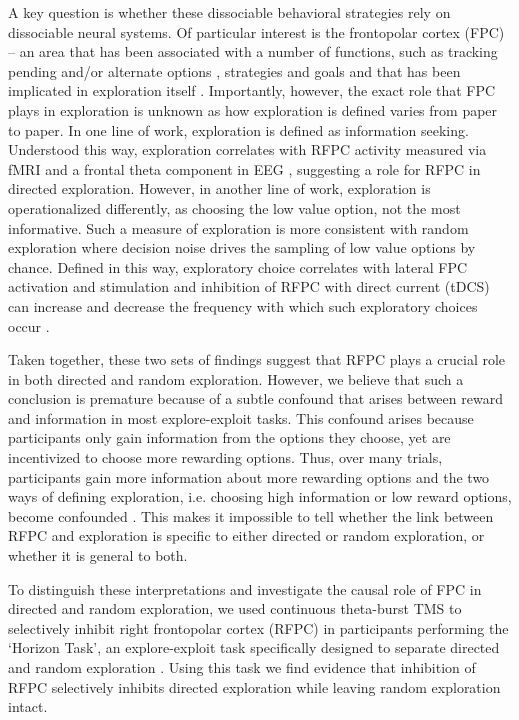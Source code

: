 \documentclass[12pt]{article}
\begin{document}
A key question is whether these dissociable behavioral strategies rely on dissociable neural systems. Of particular interest is the frontopolar cortex (FPC) -- an area that has been associated with a number of functions, such as tracking pending and/or alternate options \cite{koechlin2007anterior,Boorman2009-ns}, strategies \cite{Domenech2015-nz} and goals \cite{Pollmann2016-lc} and that has been implicated in exploration itself \cite{Badre2012-nt,Cavanagh2011-tb,Daw2006-vw}. Importantly, however, the exact role that FPC plays in exploration is unknown as how exploration is defined varies from paper to paper. In one line of work, exploration is defined as information seeking. Understood this way, exploration correlates with RFPC activity measured via fMRI \cite{Badre2012-nt} and a frontal theta component in EEG \cite{Cavanagh2011-tb}, suggesting a role for RFPC in directed exploration.  However, in another line of work, exploration is operationalized differently, as choosing the low value option, not the most informative.  Such a measure of exploration is more consistent with random exploration where decision noise drives the sampling of low value options by chance. Defined in this way, exploratory choice correlates with lateral FPC activation \cite{Daw2006-vw} and stimulation and inhibition of RFPC with direct current (tDCS) can increase and decrease the frequency with which such exploratory choices occur \cite{Raja_Beharelle2015-xg}. 

Taken together, these two sets of findings suggest that RFPC plays a crucial role in both directed and random exploration. However, we believe that such a conclusion is premature because of a subtle confound that arises between reward and information in most explore-exploit tasks. This confound arises because participants only gain information from the options they choose, yet are incentivized to choose more rewarding options. Thus, over many trials, participants gain more information about more rewarding options and the two ways of defining exploration, i.e. choosing high information or low reward options, become confounded \cite{Wilson2014-ob}.  This makes it impossible to tell whether the link between RFPC and exploration is specific to either directed or random exploration, or whether it is general to both.

To distinguish these interpretations and investigate the causal role of FPC in directed and random exploration, we used continuous theta-burst TMS \cite{Huang2005-mm} to selectively inhibit right frontopolar cortex (RFPC) in participants performing the `Horizon Task', an explore-exploit task specifically designed to separate directed and random exploration \cite{Wilson2014-ob}.  Using this task we find evidence that inhibition of RFPC selectively inhibits directed exploration while leaving random exploration intact.
\end{document}
